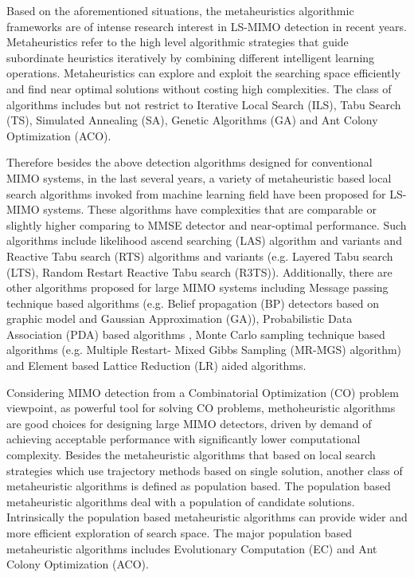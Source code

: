 Based on the aforementioned situations, the metaheuristics algorithmic frameworks are of intense research interest in LS-MIMO detection in recent years. Metaheuristics refer to the high level algorithmic strategies that guide subordinate heuristics iteratively by combining different intelligent learning operations. Metaheuristics can explore and exploit the searching space efficiently and find near optimal solutions without costing high complexities. The class of algorithms includes but not restrict to Iterative Local Search (ILS), Tabu Search (TS), Simulated Annealing (SA), Genetic Algorithms (GA) and Ant Colony Optimization (ACO).

Therefore besides the above detection algorithms designed for conventional MIMO systems, in the last several years, a variety of metaheuristic based local search algorithms invoked from machine learning field\cite{chockalingam2010low} have been proposed for LS-MIMO systems. These algorithms have complexities that are comparable or slightly higher comparing to MMSE detector and near-optimal performance. Such algorithms include likelihood ascend searching (LAS) algorithm and variants\cite{vardhan2008low}\cite{cerato2009hardware}\cite{li2010multiple} %
and Reactive Tabu search (RTS) algorithms and variants
(e.g. Layered Tabu search (LTS)\cite{srinidhi2011layered}, Random Restart Reactive Tabu search (R3TS)\cite{datta2010random}). Additionally, there are other algorithms proposed for large MIMO systems including Message passing technique based algorithms (e.g. Belief propagation (BP) detectors based on graphic model and Gaussian Approximation (GA)\cite{som2011low}\cite{som2010improved}\cite{narasimhan2014channel}\cite{goldberger2011mimo}), Probabilistic Data Association (PDA) based algorithms \cite{mohammed2009low}, Monte Carlo sampling technique based algorithms (e.g. Multiple Restart- Mixed Gibbs Sampling (MR-MGS) algorithm\cite{datta2013novel}) and Element based Lattice Reduction (LR) aided algorithms\cite{zhou2013element}.

 Considering MIMO detection from a Combinatorial Optimization (CO) problem viewpoint, as powerful tool for solving CO problems, methoheuristic algorithms\cite{blum2003metaheuristics} are good choices for designing large MIMO detectors, driven by demand of achieving acceptable performance with significantly lower computational complexity. Besides the metaheuristic algorithms that based on local search strategies which use trajectory methods based on single solution, another class of metaheuristic algorithms is defined as population based. The population based metaheuristic algorithms deal with a population of candidate solutions. Intrinsically the population based metaheuristic algorithms can provide wider and more efficient exploration of search space. The major population based metaheuristic algorithms includes Evolutionary Computation (EC) and Ant Colony Optimization (ACO). 
 
